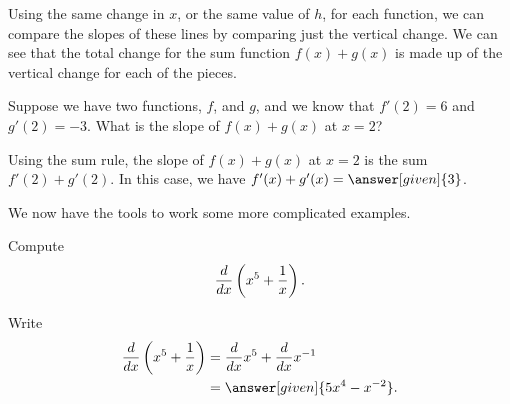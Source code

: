 \documentclass{ximera}
\begin{document}
\begin{image}
\end{image}

Using the same change in $x$, or the same value of $h$, for each function, we can
compare the slopes of these lines by comparing just the vertical change.  We can see
that the total change for the sum function $f(x) + g(x)$ is made up of the vertical change
for each of the pieces.

\begin{example}
  Suppose we have two functions, $f$, and $g$, and we know that $f'(2) = 6$ and $g'(2) = -3$.
  What is the slope of $f(x) + g(x)$ at $x = 2$?
  \begin{explanation}
  	Using the sum rule, the slope of $f(x) + g(x)$ at $x = 2$ is the sum $f'(2) + g'(2)$.   In 
	this case, we have $f'(x) + g'(x) = \answer[given]{3}$.
  \end{explanation}
\end{example} 


We now have the tools to work some more complicated examples. 


\begin{example}
Compute
\[
\frac{d}{dx} \left( x^5+\frac{1}{x}\right).
\] 
\begin{explanation}
Write
\begin{align*}
\ddx \left(x^5+\frac{1}{x}\right) &= \ddx x^5 + \ddx x^{-1} \\
&=\answer[given]{5x^4 - x^{-2}}.
\end{align*}
\end{explanation}
\end{example}
\end{document}
